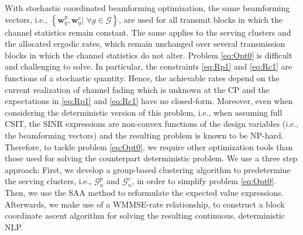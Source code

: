 \documentclass[12pt,draftcls,onecolumn]{IEEEtran}
\theoremstyle{remark}
\theoremstyle{definition}
\begin{document}
{%
\indent With stochastic coordinated beamforming optimization, the same beamforming vectors, i.e., $\left\lbrace \mathbf{w}_{g}^p, \mathbf{w}_{g}^c|\,\, \forall g \in \mathcal{G}\right\rbrace$, are used for all transmit blocks in which the channel statistics remain constant. The same applies to the serving clusters and the allocated ergodic rates, which remain unchanged over several transmission blocks in which the channel statistics do not alter. Problem \eqref{eq:Opt0} is difficult and challenging to solve. In particular, the constraints \eqref{eq:Rp1} and \eqref{eq:Rc1} are functions of a stochastic quantity.
Hence, the achievable rates depend on the current realization of channel fading which is unknown at the CP and the expectations in \eqref{eq:Rp1} and \eqref{eq:Rc1} have no closed-form. Moreover, even when considering the deterministic version of this problem, i.e., when assuming full CSIT, the SINR expressions are non-convex functions of the design variables (i.e., the beamforming vectors) and the resulting problem is known to be NP-hard. Therefore, to tackle problem \eqref{eq:Opt0}, we require other optimization tools than those used for solving the counterpart deterministic problem. We use a three step approach: First, we develop a group-based clustering algorithm to predetermine the serving clusters, i.e., $\mathcal{G}_n^p$ and $\mathcal{G}_n^c$, in order to simplify problem \eqref{eq:Opt0}. Then, we use the SAA method to reformulate the expected value expressions. Afterwards, we make use of a WMMSE-rate relationship, to construct a block coordinate ascent algorithm for solving the resulting continuous, deterministic NLP.     
}
\end{document}
